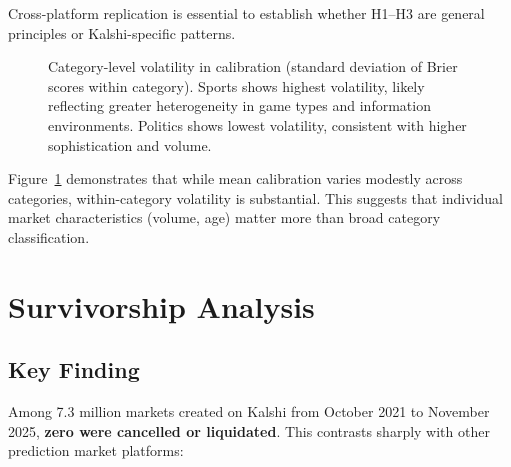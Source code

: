 \documentclass[12pt,letterpaper]{article}
\begin{document}
Cross-platform replication is essential to establish whether H1--H3 are general principles or Kalshi-specific patterns.

\begin{figure}[ht]
\centering
{}
\caption{Category-level volatility in calibration (standard deviation of Brier scores within category). Sports shows highest volatility, likely reflecting greater heterogeneity in game types and information environments. Politics shows lowest volatility, consistent with higher sophistication and volume.}
\label{fig:category-volatility}
\end{figure}

Figure~\ref{fig:category-volatility} demonstrates that while mean calibration varies modestly across categories, within-category volatility is substantial. This suggests that individual market characteristics (volume, age) matter more than broad category classification.

\clearpage
\section{Survivorship Analysis}\label{sec:survivorship}

\subsection{Key Finding}

Among 7.3 million markets created on Kalshi from October 2021 to November 2025, \textbf{zero were cancelled or liquidated}. This contrasts sharply with other prediction market platforms:
\end{document}
